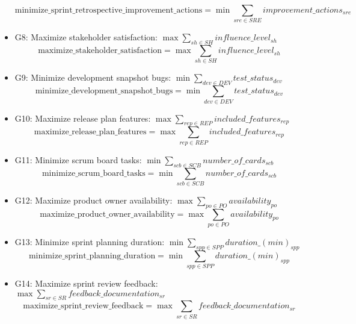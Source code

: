 \documentclass{article}
\begin{document}
\begin{itemize}
        \begin{equation*}
            \text{minimize\_sprint\_retrospective\_improvement\_actions} = \min \sum_{sre \in SRE} improvement\_actions_{sre}
        \end{equation*}
    \item G8: Maximize stakeholder satisfaction: $\max \sum_{sh \in SH} influence\_level_{sh}$
        \begin{equation*}
            \text{maximize\_stakeholder\_satisfaction} = \max \sum_{sh \in SH} influence\_level_{sh}
        \end{equation*}
    \item G9: Minimize development snapshot bugs: $\min \sum_{dev \in DEV} test\_status_{dev}$
        \begin{equation*}
            \text{minimize\_development\_snapshot\_bugs} = \min \sum_{dev \in DEV} test\_status_{dev}
        \end{equation*}
    \item G10: Maximize release plan features: $\max \sum_{rep \in REP} included\_features_{rep}$
        \begin{equation*}
            \text{maximize\_release\_plan\_features} = \max \sum_{rep \in REP} included\_features_{rep}
        \end{equation*}
    \item G11: Minimize scrum board tasks: $\min \sum_{scb \in SCB} number\_of\_cards_{scb}$
        \begin{equation*}
            \text{minimize\_scrum\_board\_tasks} = \min \sum_{scb \in SCB} number\_of\_cards_{scb}
        \end{equation*}
    \item G12: Maximize product owner availability: $\max \sum_{po \in PO} availability_{po}$
        \begin{equation*}
            \text{maximize\_product\_owner\_availability} = \max \sum_{po \in PO} availability_{po}
        \end{equation*}
    \item G13: Minimize sprint planning duration: $\min \sum_{spp \in SPP} duration\_(min)_{spp}$
        \begin{equation*}
            \text{minimize\_sprint\_planning\_duration} = \min \sum_{spp \in SPP} duration\_(min)_{spp}
        \end{equation*}
    \item G14: Maximize sprint review feedback: $\max \sum_{sr \in SR} feedback\_documentation_{sr}$
        \begin{equation*}
            \text{maximize\_sprint\_review\_feedback} = \max \sum_{sr \in SR} feedback\_documentation_{sr}
        \end{equation*}
\end{itemize}
\end{document}
